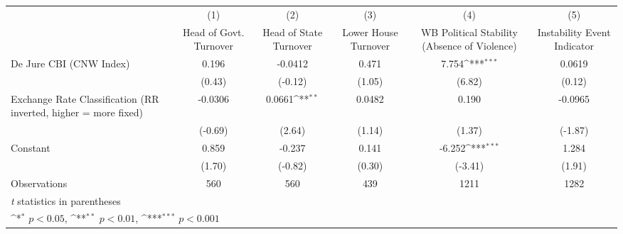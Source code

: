 {
\def\sym#1{\ifmmode^{#1}\else\(^{#1}\)\fi}
\begin{tabular*}{\linewidth}{@{\hskip\tabcolsep\extracolsep\fill}l*{5}{c}}
\hline\hline
                &\multicolumn{1}{c}{(1)}&\multicolumn{1}{c}{(2)}&\multicolumn{1}{c}{(3)}&\multicolumn{1}{c}{(4)}&\multicolumn{1}{c}{(5)}\\
                &\multicolumn{1}{c}{Head of Govt. Turnover}&\multicolumn{1}{c}{Head of State Turnover}&\multicolumn{1}{c}{Lower House Turnover}&\multicolumn{1}{c}{WB Political Stability (Absence of Violence)}&\multicolumn{1}{c}{Instability Event Indicator}\\
\hline
De Jure CBI (CNW Index)&    0.196         &  -0.0412         &    0.471         &    7.754\sym{***}&   0.0619         \\
                &   (0.43)         &  (-0.12)         &   (1.05)         &   (6.82)         &   (0.12)         \\
[1em]
Exchange Rate Classification (RR inverted, higher = more fixed)&  -0.0306         &   0.0661\sym{**} &   0.0482         &    0.190         &  -0.0965         \\
                &  (-0.69)         &   (2.64)         &   (1.14)         &   (1.37)         &  (-1.87)         \\
[1em]
Constant        &    0.859         &   -0.237         &    0.141         &   -6.252\sym{***}&    1.284         \\
                &   (1.70)         &  (-0.82)         &   (0.30)         &  (-3.41)         &   (1.91)         \\
\hline
Observations    &      560         &      560         &      439         &     1211         &     1282         \\
\hline\hline
\multicolumn{6}{l}{\footnotesize \textit{t} statistics in parentheses}\\
\multicolumn{6}{l}{\footnotesize \sym{*} \(p<0.05\), \sym{**} \(p<0.01\), \sym{***} \(p<0.001\)}\\
\end{tabular*}
}
